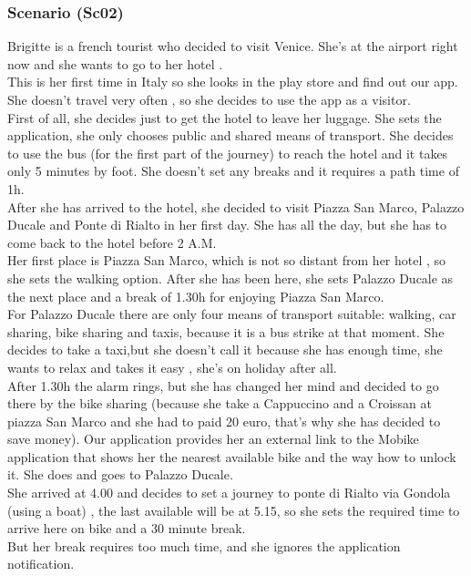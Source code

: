 \documentclass[a4paper,leqno]{book}
\begin{document}
\subsubsection{Scenario (Sc02) }
Brigitte is a french tourist who decided to visit Venice. She's at the airport right now and she wants to go to her hotel .\\
This is her first time in Italy so she looks in the play store and find out our app.
She doesn't travel very often , so she decides to use the app as a visitor.\\
First of all, she decides just to get the hotel to leave her luggage.
She sets the application, she only chooses public and shared means of transport. 
She decides to use the bus (for the first part of the journey) to reach the hotel and  it takes only 5 minutes by foot. 
She doesn't set any breaks and it requires a path time of 1h.\\
After she has arrived to the hotel, she decided to visit Piazza San Marco, Palazzo Ducale and Ponte di Rialto in her first day.
She has all the day, but she has to come back to the hotel before 2 A.M.\\
Her first place is Piazza San Marco, which is not so distant from her hotel , so she sets the walking option. 
After she has been here, she sets Palazzo Ducale as the next place and a break of 1.30h for enjoying Piazza San Marco.\\
For Palazzo Ducale there are only four means of transport suitable: walking, car sharing, bike sharing and taxis, because it is a bus strike at that moment. 
She decides to take a taxi,but she doesn't call it because she has enough time,  she wants to relax and takes it easy , she's on holiday after all.\\
After 1.30h the alarm rings, but she has changed her mind  and decided to go there by the bike sharing (because she take a Cappuccino and a Croissan at piazza San Marco and she had to paid 20 euro, that's why she has decided to save money). 
Our application provides her an external link to the Mobike application that shows her the nearest available bike and the way how to unlock it.
She does and goes to Palazzo Ducale.\\
She arrived at 4.00 and decides to set a journey to ponte di Rialto via Gondola (using a boat) , the last available will be at 5.15, so she sets the required time to arrive here on bike and a 30 minute break.\\
But her break requires too much time, and she ignores the application notification.
\end{document}
